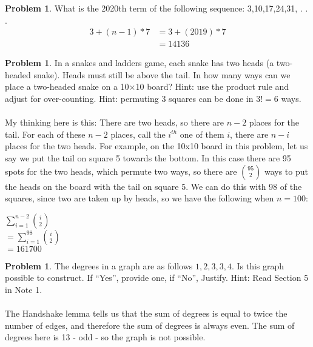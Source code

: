 \documentclass[10pt,leqno ]{article}
\theoremstyle{definition}
\newtheorem{problem}[theorem]{Problem}
\begin{document}
\begin{problem} What is the 2020th term of the following sequence: 3,10,17,24,31, . . .
\\
\begin{align*}
3 + (n-1) * 7 &= 3 + (2019)* 7 \\
              &= 14136
\end{align*}

\end{problem}
\newpage

\begin{problem} In a snakes and ladders game,  each snake has two heads (a two-headed snake).   Heads  must  still  be  above  the  tail.   In  how  many  ways  can  we place a two-headed snake on a 10×10 board?  Hint:  use the product rule and adjust for over-counting.  Hint:  permuting 3 squares can be done in $3! = 6$ ways.
\\\\
My thinking here is this: There are two heads, so there are $n-2$ places for the tail.  For each of these $n-2$ places, call the $i^{th}$ one of them $i$,  there are $n-i$ places for the two heads.  For example, on the 10x10 board in this problem, let us say we put the tail on square 5 towards the bottom.  In this case there are 95 spots for the two heads, which permute two ways, so there are ${95 \choose 2}$ ways to put the heads on the board with the tail on square 5.  We can do this with 98 of the squares, since two are taken up by heads, so we have the following when $n=100$:
\begin{center}
$\sum_{i=1}^{n-2} {i \choose 2}$\\
$ = \sum_{i=1}^{98} {i \choose 2}$\\
$ = 161700$
\end{center}
\end{problem}
\newpage

\begin{problem} The degrees in a graph are as follows ${1,2,3,3,4}$.  Is this graph possible to construct.  If “Yes”, provide one, if “No”, Justify.  Hint:  Read Section 5 in Note 1.
\\\\
The Handshake lemma tells us that the sum of degrees is equal to twice the number of edges, and therefore the sum of degrees is always even.  The sum of degrees here is 13 - odd - so the graph is not possible.
\end{problem}
\newpage
\end{document}
